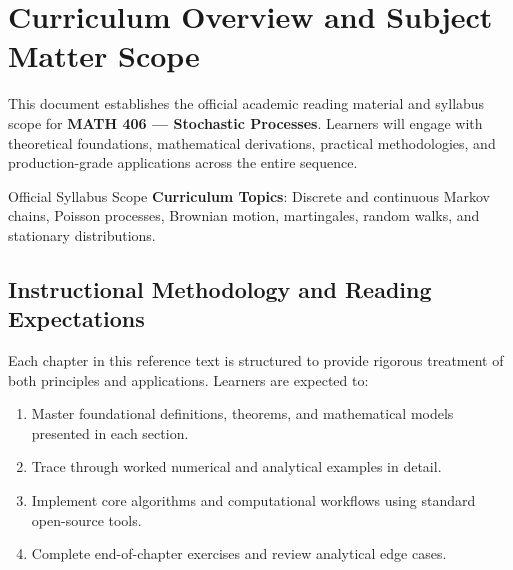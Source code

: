 \section{Curriculum Overview and Subject Matter Scope}

This document establishes the official academic reading material and syllabus scope for \textbf{MATH 406 --- Stochastic Processes}. Learners will engage with theoretical foundations, mathematical derivations, practical methodologies, and production-grade applications across the entire sequence.

\begin{InsightBox}{Official Syllabus Scope}
  \textbf{Curriculum Topics}: Discrete and continuous Markov chains, Poisson processes, Brownian motion, martingales, random walks, and stationary distributions.
\end{InsightBox}

\subsection{Instructional Methodology and Reading Expectations}

Each chapter in this reference text is structured to provide rigorous treatment of both principles and applications. Learners are expected to:
\begin{enumerate}
  \item Master foundational definitions, theorems, and mathematical models presented in each section.
  \item Trace through worked numerical and analytical examples in detail.
  \item Implement core algorithms and computational workflows using standard open-source tools.
  \item Complete end-of-chapter exercises and review analytical edge cases.
\end{enumerate}

